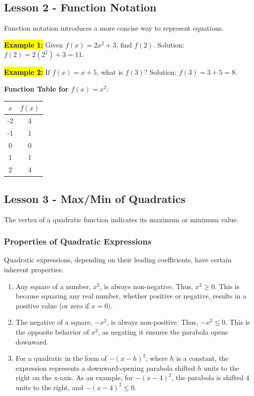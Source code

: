\documentclass[12pt,a4paper]{article}
\begin{document}
\subsection*{Lesson 2 - Function Notation}
Function notation introduces a more concise way to represent equations.

\textbf{\hl{Example 1:}} Given \(f(x) = 2x^2 + 3\), find \(f(2)\). Solution: \(f(2) = 2(2^2) + 3 = 11\).

\textbf{\hl{Example 2:}} If \(f(x) = x + 5\), what is \(f(3)\)? Solution: \(f(3) = 3 + 5 = 8\).

\textbf{Function Table for \(f(x) = x^2\)}:
\begin{center}
    \begin{tabular}{c|c}
        \( x \) & \( f(x) \) \\
        \hline
        -2 & 4 \\
        -1 & 1 \\
        0 & 0 \\
        1 & 1 \\
        2 & 4 \\
    \end{tabular}
\end{center}
\newpage
\subsection{Lesson 3 - Max/Min of Quadratics}
The vertex of a quadratic function indicates its maximum or minimum value.
\subsubsection*{Properties of Quadratic Expressions}

Quadratic expressions, depending on their leading coefficients, have certain inherent properties:

\begin{enumerate}
    \item Any square of a number, \(x^2\), is always non-negative. Thus, \(x^2 \geq 0\). This is because squaring any real number, whether positive or negative, results in a positive value (or zero if \(x = 0\)).
    
    \item The negative of a square, \(-x^2\), is always non-positive. Thus, \(-x^2 \leq 0\). This is the opposite behavior of \(x^2\), as negating it ensures the parabola opens downward.
    
    \item For a quadratic in the form of \(-(x-h)^2\), where \(h\) is a constant, the expression represents a downward-opening parabola shifted \(h\) units to the right on the x-axis. As an example, for \(-(x-4)^2\), the parabola is shifted 4 units to the right, and \(-(x-4)^2 \leq 0\).
\end{enumerate}
\end{document}
